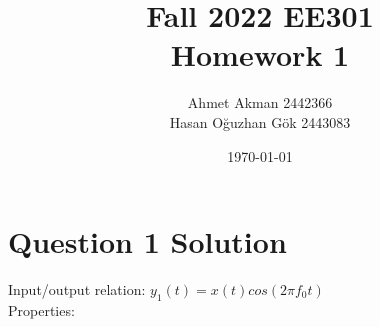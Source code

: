 \documentclass[letterpaper,12pt]{article}
\begin{document}
\thispagestyle{empty}

\title{Fall 2022 EE301  \protect\\ Homework 1}
\author{Ahmet Akman 2442366 \protect\\ Hasan Oğuzhan Gök 2443083 }
\date{\today}
\maketitle
\tableofcontents
\section{Question 1 Solution}
Input/output relation: \(y_1(t)= x(t)cos(2 \pi f_0 t) \)
\\ Properties:
\end{document}
